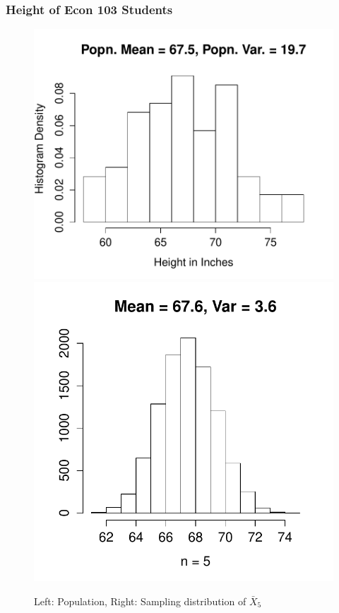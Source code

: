 \documentclass[handout]{beamer}
\begin{document}
\begin{frame}
\frametitle{Height of Econ 103 Students}
\begin{figure}
\includegraphics[scale = 0.4]{./images/height_hist}
\includegraphics[scale = 0.4]{./images/height_mean_n_5}
\caption{Left: Population, Right: Sampling distribution of $\bar{X}_5$}
\end{figure}
\end{frame}
\end{document}
